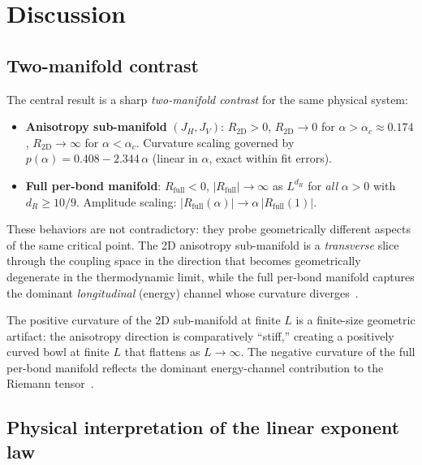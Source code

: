 \documentclass[twocolumn,showpacs,preprintnumbers,amsmath,amssymb,prl]{revtex4-2}
\newcommand{\dR}{d_R}
\newcommand{\RtwoD}{R_{\mathrm{2D}}}
\newcommand{\Rfull}{R_{\mathrm{full}}}
\newcommand{\alphac}{\alpha_c}
\begin{document}
\section{Discussion}
\label{sec:discussion}

\subsection{Two-manifold contrast}

The central result is a sharp \emph{two-manifold contrast} for the same
physical system:

\begin{itemize}
  \item[(a)] \textbf{Anisotropy sub-manifold} $(J_H, J_V)$:
    $\RtwoD > 0$, $\RtwoD \to 0$ for $\alpha > \alphac \approx 0.174$,
    $\RtwoD \to \infty$ for $\alpha < \alphac$.
    Curvature scaling governed by $p(\alpha) = 0.408 - 2.344\,\alpha$
    (linear in $\alpha$, exact within fit errors).

  \item[(b)] \textbf{Full per-bond manifold}:
    $\Rfull < 0$, $|\Rfull| \to \infty$ as $L^{d_R}$ for \emph{all}
    $\alpha > 0$ with $\dR \geq 10/9$.
    Amplitude scaling: $|\Rfull(\alpha)| \to \alpha\,|\Rfull(1)|$.
\end{itemize}

These behaviors are not contradictory: they probe geometrically different aspects
of the same critical point.
The 2D anisotropy sub-manifold is a \emph{transverse} slice through the coupling
space in the direction that becomes geometrically degenerate in the thermodynamic
limit, while the full per-bond manifold captures the dominant \emph{longitudinal}
(energy) channel whose curvature diverges~\cite{ZhuravlevPaper8}.

The positive curvature of the 2D sub-manifold at finite $L$ is a finite-size
geometric artifact: the anisotropy direction is comparatively ``stiff,'' creating
a positively curved bowl at finite $L$ that flattens as $L \to \infty$.
The negative curvature of the full per-bond manifold reflects the dominant
energy-channel contribution to the Riemann tensor~\cite{ZhuravlevPaper7}.

\subsection{Physical interpretation of the linear exponent law}
\end{document}
